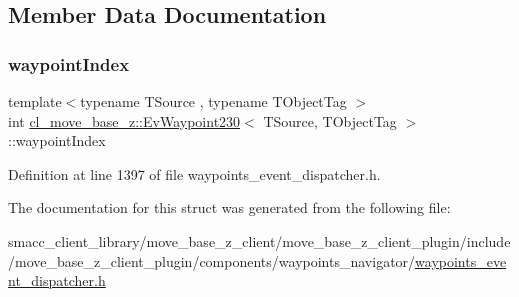 \subsection{Member Data Documentation}
\mbox{\label{structcl__move__base__z_1_1EvWaypoint230_a1c20426dc5265703bf9d973174c28565}} 
\subsubsection{\texorpdfstring{waypoint\+Index}{waypointIndex}}
{\footnotesize\ttfamily template$<$typename T\+Source , typename T\+Object\+Tag $>$ \\
int \hyperlink{structcl__move__base__z_1_1EvWaypoint230}{cl\+\_\+move\+\_\+base\+\_\+z\+::\+Ev\+Waypoint230}$<$ T\+Source, T\+Object\+Tag $>$\+::waypoint\+Index}



Definition at line 1397 of file waypoints\+\_\+event\+\_\+dispatcher.\+h.



The documentation for this struct was generated from the following file\+:\begin{DoxyCompactItemize}
\item 
smacc\+\_\+client\+\_\+library/move\+\_\+base\+\_\+z\+\_\+client/move\+\_\+base\+\_\+z\+\_\+client\+\_\+plugin/include/move\+\_\+base\+\_\+z\+\_\+client\+\_\+plugin/components/waypoints\+\_\+navigator/\hyperlink{waypoints__event__dispatcher_8h}{waypoints\+\_\+event\+\_\+dispatcher.\+h}\end{DoxyCompactItemize}
